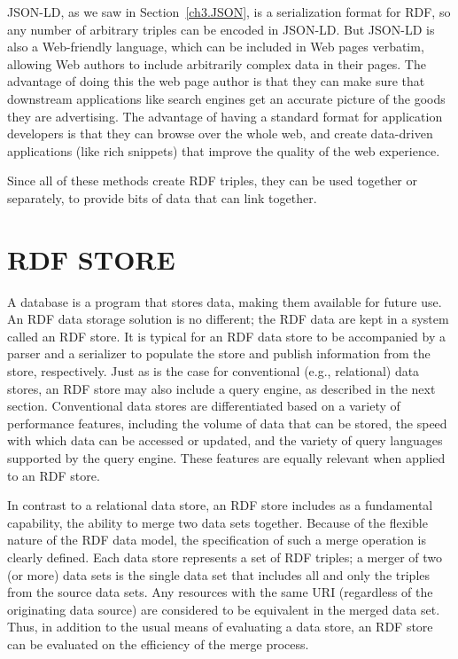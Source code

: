JSON-LD, as we saw in Section~\ref{ch3.JSON}, is a serialization format for RDF, so 
any number of arbitrary triples can be encoded in JSON-LD.  But JSON-LD is also 
a Web-friendly language, which can be included in Web pages verbatim, allowing Web
authors to include arbitrarily complex data in their pages. The advantage of doing this 
the web page author is that they can make sure that downstream applications
like search engines get an accurate picture of the goods they are advertising. 
The advantage of having a standard format for application developers is that they 
can browse over the whole web, and create data-driven applications (like rich snippets)
that improve the quality of the web experience. 

Since all of these methods create RDF triples, they can be used together or 
separately, to provide bits of data that can link together. 


\section{RDF STORE}

A database is a program that stores data, making them available for
future use. An RDF data storage solution is no different; the RDF data
are kept in a system called an RDF store. It is typical for an RDF data
store to be accompanied by a parser and a serializer to populate the
store and publish information from the store, respectively. Just as is
the case for conventional (e.g., relational) data stores, an RDF store
may also include a query engine, as described in the next section.
Conventional data stores are differentiated based on a variety of
performance features, including the volume of data that can be stored,
the speed with which data can be accessed or updated, and the variety of
query languages supported by the query engine. These features are
equally relevant when applied to an RDF store.

In contrast to a relational data store, an RDF store includes as a
fundamental capability, the ability to merge two data sets together.
Because of the flexible nature of the RDF data model, the specification
of such a merge operation is clearly defined. Each data store represents
a set of RDF triples; a merger of two (or more) data sets is the single
data set that includes all and only the triples from the source data
sets. Any resources with the same URI (regardless of the originating
data source) are considered to be equivalent in the merged data set.
Thus, in addition to the usual means of evaluating a data store, an RDF
store can be evaluated on the efficiency of the merge process.

